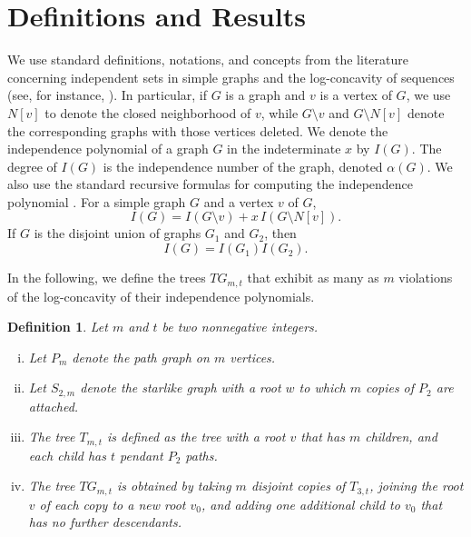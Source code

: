 \documentclass[reqno]{amsart}
\newtheorem{definition}{Definition}
\begin{document}
\section{Definitions and Results}
We use standard definitions, notations, and concepts from the literature concerning independent sets in simple graphs and the log-concavity of sequences (see, for instance, \cite{Kadrawi, Galvin}). In particular, if $G$ is a graph and $v$ is a vertex of $G$, we use $N[v]$ to denote the closed neighborhood of $v$, while $G\setminus v$ and $G\setminus N[v]$ denote the corresponding graphs with those vertices deleted. We denote the independence polynomial of a graph $G$ in the indeterminate $x$ by $I(G)$. The degree of $I(G)$ is the independence number of the graph, denoted $\alpha(G)$. We also use the standard recursive formulas for computing the independence polynomial \cite{Arocha,Gutman}. For a simple graph $G$ and a vertex $v$ of $G$,
\begin{equation}
\label{eq:Aro}
I(G) = I(G \setminus v) + x \,I(G \setminus N[v]).
\end{equation}
If $G$ is the disjoint union of graphs $G_1$ and $G_2$, then
\begin{equation}
\label{eq:Aro1}
I(G) = I(G_1) I(G_2).
\end{equation}


In the following, we define the trees $TG_{m,t}$ that exhibit as many as 
$m$ violations of the log-concavity of their independence polynomials.

\begin{definition}
Let $m$ and $t$ be two nonnegative integers.
\begin{enumerate}[(i)]
    \item Let $P_m$ denote the path graph on $m$ vertices.
    \item Let $S_{2,m}$ denote the starlike graph with a root $w$ to which $m$ copies of $P_2$ are attached.
    \item The tree $T_{m,t}$ is defined as the tree with a root $v$ that has $m$ children, and each child has $t$ pendant $P_2$ paths.
    \item The tree $TG_{m,t}$ is obtained by taking $m$ disjoint copies of $T_{3,t}$, joining the root $v$ of each copy to a new root $v_0$, and adding one additional child to $v_0$ that has no further descendants.
\end{enumerate}
\end{definition}
\end{document}
